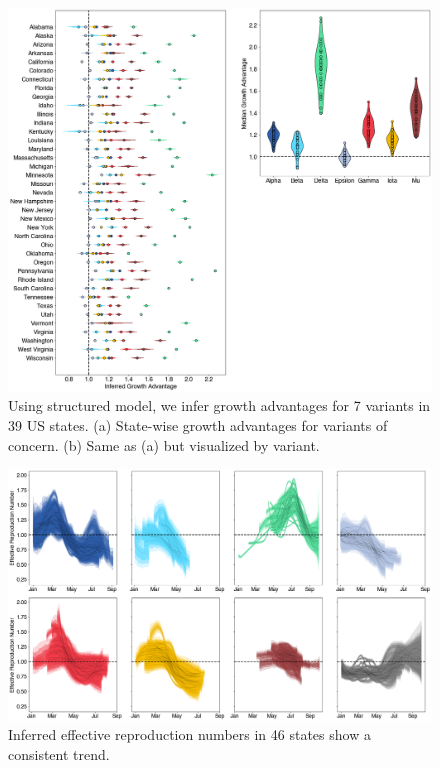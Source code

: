\documentclass[11pt,oneside,letterpaper]{article}
\begin{document}
\begin{figure}
  \centering
  \includegraphics[width=\linewidth]{figs/fig_3_growth_advantages.png}
  \caption{Using structured model, we infer growth advantages for 7 variants in 39 US states.
  (a) State-wise growth advantages for variants of concern.
  (b) Same as (a) but visualized by variant.}%
  \label{fig:3}
\end{figure}

\begin{figure}
  \centering
  \includegraphics[width=\linewidth]{figs/fig_4_rt_consensus.png}
  \caption{Inferred effective reproduction numbers in 46 states show a consistent trend.}%
  \label{fig:4}
\end{figure}
\end{document}
